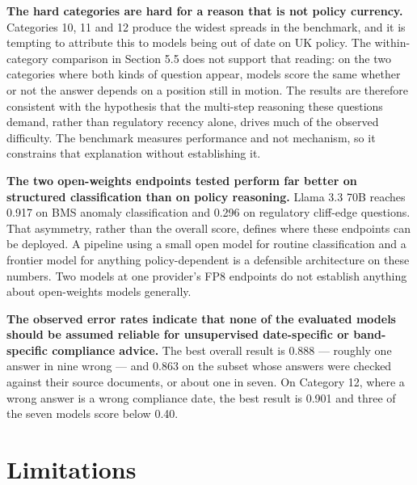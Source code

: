\documentclass[11pt,a4paper]{article}
\begin{document}
\textbf{The hard categories are hard for a reason that is not policy currency.} Categories 10, 11 and 12 produce the widest spreads in the benchmark, and it is tempting to attribute this to models being out of date on UK policy. The within-category comparison in Section 5.5 does not support that reading: on the two categories where both kinds of question appear, models score the same whether or not the answer depends on a position still in motion. The results are therefore consistent with the hypothesis that the multi-step reasoning these questions demand, rather than regulatory recency alone, drives much of the observed difficulty. The benchmark measures performance and not mechanism, so it constrains that explanation without establishing it.

\textbf{The two open-weights endpoints tested perform far better on structured classification than on policy reasoning.} Llama 3.3 70B reaches 0.917 on BMS anomaly classification and 0.296 on regulatory cliff-edge questions. That asymmetry, rather than the overall score, defines where these endpoints can be deployed. A pipeline using a small open model for routine classification and a frontier model for anything policy-dependent is a defensible architecture on these numbers. Two models at one provider's FP8 endpoints do not establish anything about open-weights models generally.

\textbf{The observed error rates indicate that none of the evaluated models should be assumed reliable for unsupervised date-specific or band-specific compliance advice.} The best overall result is 0.888 --- roughly one answer in nine wrong --- and 0.863 on the subset whose answers were checked against their source documents, or about one in seven. On Category 12, where a wrong answer is a wrong compliance date, the best result is 0.901 and three of the seven models score below 0.40.


\section{Limitations}
\end{document}
